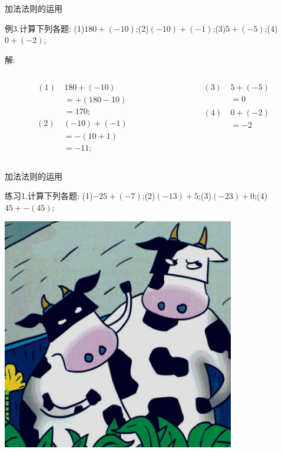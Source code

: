 \documentclass{beamer}
\begin{document}
\def\vspacea{\vspace*{-4em}}
\begin{frame}{加法法则的运用}
  \begin{exampleblock}{例3.计算下列各题:}
    (1)$180+(-10)$;\quad   (2)$(-10)+(-1)$;\quad  (3)$5+(-5)$;\quad (4)$0+(-2)$;
  \end{exampleblock}  \pause
  \begin{block}{解:}  \pause
    \begin{columns}  
      \begin{column}{0.5\textwidth}  
        \begin{align*}
          (1)\ &180+(-10)\\  
               &=+(180-10)\\
               &=170;  
        \end{align*}
        \vspacea
        \begin{align*}
          (2)\ &(-10)+(-1)\\ 
               &=-(10+1)\\  
               &=-11;  
        \end{align*}
      \end{column}
      \begin{column}{0.5\textwidth}
        \begin{align*}
          (3)\ &5+(-5)\\  
              &=0\\  
        \end{align*}
        \vspacea
        \begin{align*}
          (4)\ &0+(-2)\\ 
               &=-2\\  
        \end{align*} 
 
      \end{column}
    \end{columns}
  \end{block}
\end{frame}

\begin{frame}{加法法则的运用}
  \begin{block}{练习1.计算下列各题:}
    (1)$-25+(-7)$;\quad   (2)$(-13)+5$;\quad  (3)$(-23)+0$;\quad (4)$45+-(45)$;
  \end{block}
\end{frame}


\begin{frame}
\includegraphics[width=4in]{COWS.jpg}
\end{frame}
\end{document}

